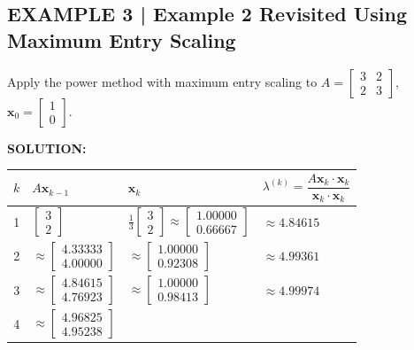 \documentclass{article}
\begin{document}
\subsection*{EXAMPLE 3 | Example 2 Revisited Using Maximum Entry Scaling}

Apply the power method with maximum entry scaling to
$A = \begin{bmatrix}3&2\\2&3\end{bmatrix}$, $\mathbf{x}_0=\begin{bmatrix}1\\0\end{bmatrix}$.

\textbf{SOLUTION:}

\renewcommand{\arraystretch}{1.25}
\begin{center}
\begin{tabular}{|c|l|l|l|}
\hline
$k$ & $A\mathbf{x}_{k-1}$ & $\mathbf{x}_k$ &
$\lambda^{(k)} = \dfrac{A\mathbf{x}_k\cdot\mathbf{x}_k}{\mathbf{x}_k\cdot\mathbf{x}_k}$ \\
\hline
1 & $\begin{bmatrix}3\\2\end{bmatrix}$ &
$\frac{1}{3}\begin{bmatrix}3\\2\end{bmatrix}\approx\begin{bmatrix}1.00000\\0.66667\end{bmatrix}$ &
$\approx 4.84615$ \\
\hline
2 & $\approx\begin{bmatrix}4.33333\\4.00000\end{bmatrix}$ &
$\approx\begin{bmatrix}1.00000\\0.92308\end{bmatrix}$ &
$\approx 4.99361$ \\
\hline
3 & $\approx\begin{bmatrix}4.84615\\4.76923\end{bmatrix}$ &
$\approx\begin{bmatrix}1.00000\\0.98413\end{bmatrix}$ &
$\approx 4.99974$ \\
\hline
4 & $\approx\begin{bmatrix}4.96825\\4.95238\end{bmatrix}$ &

\end{tabular}
\end{center}
\end{document}
